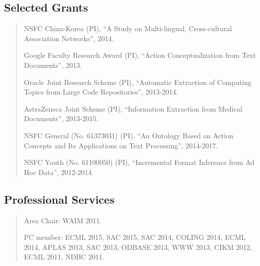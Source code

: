 \documentclass[10pt,a4paper]{article}
\begin{document}
\subsection*{Selected Grants}
\begin{quote}
%
NSFC China-Korea (PI), ``A Study on
Multi-lingual, Cross-cultural Association Networks'', 2014. 

Google Faculty Research Award (PI), ``Action Conceptualization from
Text Documents'', 2013. 

Oracle Joint Research Scheme (PI), ``Automatic Extraction of Computing Topics
from Large Code Repositories'', 2013-2014. 

AstraZeneca Joint Scheme (PI), ``Information Extraction from Medical
Documents'', 2013-2015. 

NSFC General (No. 61373031) (PI), ``An Ontology Based on Action
Concepts and Its Applications on Text Processing'', 2014-2017.

%
%
%
NSFC Youth (No. 61100050) (PI), ``Incremental Format Inference from Ad Hoc Data'', 2012-2014. 
%
\end{quote}
%
%
%
%
%
%
%
\subsection*{Professional Services}
\begin{quote}
Area Chair: WAIM 2011.

PC member: ECML 2015, SAC 2015, SAC 2014, COLING 2014, ECML 2014, APLAS 2013, SAC 2013, ODBASE 2013, WWW 2013, CIKM 2012, ECML 2011, NDBC 2011.
\end{quote}
\end{document}
